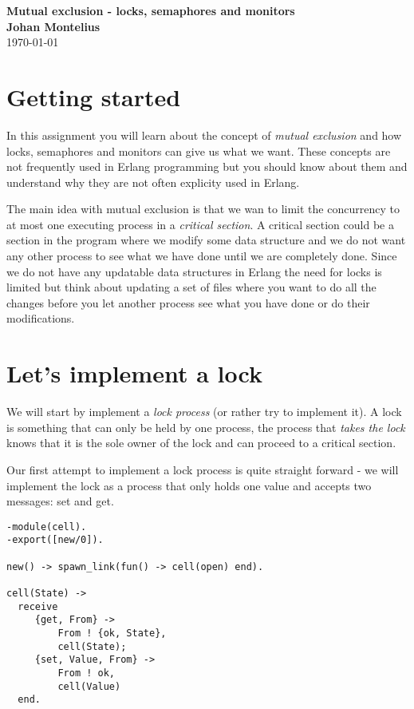 \documentclass[a4paper,11pt]{article}
\newcommand{\nnsection}[1]{
\section*{#1}
\addcontentsline{toc}{section}{#1}
}
\begin{document}
\begin{center}
\vspace{20pt}
\textbf{\large Mutual exclusion - locks, semaphores and monitors}\\
\vspace{10pt}
\textbf{Johan Montelius}\\
\vspace{10pt}
\today{}
\end{center}


\nnsection{Getting started}

In this assignment you will learn about the concept of {\em mutual
  exclusion} and how locks, semaphores and monitors can give us what
we want. These concepts are not frequently used in Erlang programming
but you should know about them and understand why they are not often
explicity used in Erlang.

The main idea with mutual exclusion is that we wan to limit the
concurrency to at most one executing process in a {\em critical
  section}. A critical section could be a section in the program where
we modify some data structure and we do not want any other process to
see what we have done until we are completely done. Since we do not
have any updatable data structures in Erlang the need for locks is
limited but think about updating a set of files where you want to do
all the changes before you let another process see what you have done
or do their modifications.

\section{Let's implement a lock}

We will start by implement a {\em lock process} (or rather try to
implement it). A lock is something that can only be held by one
process, the process that {\em takes the lock} knows that it is the
sole owner of the lock and can proceed to a critical section.



Our first attempt to implement a lock process is quite straight forward
- we will implement the lock as a process that only holds one value
and accepts two messages: set and get.

\begin{verbatim}
-module(cell).
-export([new/0]).

new() -> spawn_link(fun() -> cell(open) end).

cell(State) ->
  receive
     {get, From} -> 
         From ! {ok, State}, 
         cell(State);
     {set, Value, From} -> 
         From ! ok, 
         cell(Value)
  end.
\end{verbatim}
\end{document}
